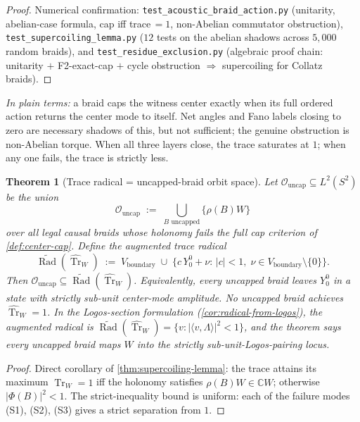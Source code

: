 \documentclass[11pt,a4paper]{article}
\theoremstyle{plain}
\newtheorem{theorem}{Theorem}[section]
\theoremstyle{definition}
\theoremstyle{remark}
\numberwithin{equation}{section}
\newcommand{\Complex}{\mathbb{C}}
\DeclareMathOperator{\Tr}{Tr}
\DeclareMathOperator{\Rad}{Rad}
\begin{document}
\begin{proof}
Numerical confirmation:
\texttt{test\_acoustic\_braid\_action.py} (unitarity, abelian-case
formula, cap iff trace\,$=1$, non-Abelian commutator obstruction),
\texttt{test\_supercoiling\_lemma.py} ($12$ tests on the
abelian shadows across $5{,}000$ random braids), and
\texttt{test\_residue\_exclusion.py}
(algebraic proof chain: unitarity $+$ F2-exact-cap $+$
cycle obstruction $\Rightarrow$ supercoiling for Collatz braids).
\end{proof}

\noindent\emph{In plain terms:} a braid caps the witness center
exactly when its full ordered action returns the center mode to
itself.  Net angles and Fano labels closing to zero are necessary
shadows of this, but not sufficient; the genuine obstruction is
non-Abelian torque.  When all three layers close, the trace
saturates at \(1\); when any one fails, the trace is strictly less.

\begin{theorem}[Trace radical = uncapped-braid orbit space]
\label{thm:trace-radical-uncapped}
Let $\mathcal{O}_{\mathrm{uncap}}\subseteq L^2(S^2)$ be the union
\[
  \mathcal{O}_{\mathrm{uncap}}\;:=\;\bigcup_{B\text{ uncapped}}
        \bigl\{\rho(B)W\bigr\}
\]
over all legal causal braids whose holonomy fails the full cap
criterion of \cref{def:center-cap}.  Define the
\emph{augmented trace radical}
\[
  \widetilde{\Rad}(\widehat{\Tr}_W)
  \;:=\;V_{\mathrm{boundary}}
        \;\cup\;
        \bigl\{c\,Y_0^0+\nu:\,
              |c|<1,\;\nu\in V_{\mathrm{boundary}}\setminus\{0\}\bigr\}.
\]
Then $\mathcal{O}_{\mathrm{uncap}}\subseteq
\widetilde{\Rad}(\widehat{\Tr}_W)$.  Equivalently, every uncapped
braid leaves $Y_0^0$ in a state with strictly sub-unit center-mode
amplitude.  No uncapped braid achieves $\widehat{\Tr}_W=1$.  In
the Logos-section formulation
(\cref{cor:radical-from-logos}), the augmented radical is
$\widetilde{\Rad}(\widehat{\Tr}_W)
=\{v:|\langle v,\Lambda\rangle|^2<1\}$, and the theorem says every
uncapped braid maps $W$ into the strictly sub-unit-Logos-pairing
locus.
\end{theorem}

\begin{proof}
Direct corollary of \cref{thm:supercoiling-lemma}: the trace
attains its maximum $\widehat{\Tr}_W=1$ iff the holonomy
satisfies $\rho(B)W\in\Complex W$; otherwise $|\Phi(B)|^2<1$.
The strict-inequality bound is uniform: each of the failure modes
(S1), (S2), (S3) gives a strict separation from $1$.
\end{proof}
\end{document}
